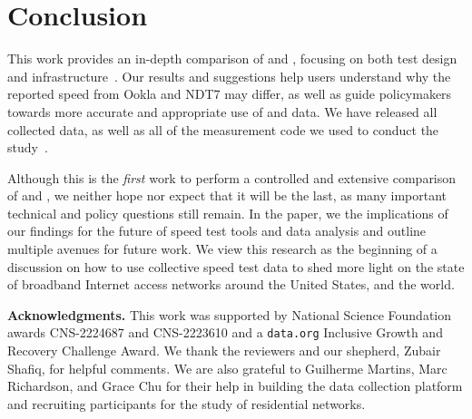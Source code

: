 \section{Conclusion}\label{sec:conclusion}

This work provides an in-depth comparison of \ookla and \ndt, focusing on both
test design and infrastructure~\cite{macmillan2023comparative}. Our results and
suggestions help users understand why the reported speed from Ookla and NDT7 may
differ, as well as guide policymakers towards more accurate and appropriate use
of \ookla and \ndt data.  We have released all collected data, as well as all of
the measurement code we used to conduct the
study~\cite{netrics-code,netrics-data}. 

Although this is the {\em first} work to perform a controlled and extensive
comparison of \ookla and \ndt, we neither hope nor expect that it will be the
last, as many important technical and policy questions still remain. In the
paper, we the implications of our findings for the future of speed test tools
and data analysis and outline multiple avenues for future work. We view this
research as the beginning of a discussion on how to use collective speed test
data to shed more light on the state of broadband Internet access networks
around the United States, and the world.

\noindent \textbf{Acknowledgments.} This work was supported by National Science
Foundation awards CNS-2224687 and CNS-2223610 and a {\tt data.org} Inclusive
Growth and Recovery Challenge Award.  We thank the reviewers and our shepherd,
Zubair Shafiq, for helpful comments. We are also grateful to Guilherme Martins,
Marc Richardson, and Grace Chu for their help in building the data collection
platform and recruiting participants for the study of residential networks.

